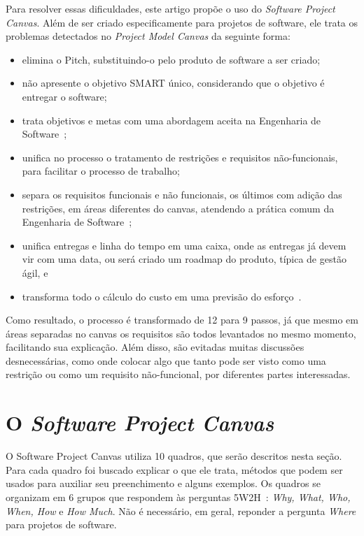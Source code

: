 \documentclass[a4]{report}
\begin{document}
Para resolver essas dificuldades, este artigo propõe o uso do \textit{Software Project Canvas}. Além de ser criado especificamente para projetos de software, ele trata os problemas detectados no \textit{Project Model Canvas} da seguinte forma:
\begin{itemize}
    \item elimina o Pitch, substituindo-o pelo produto de software a ser criado;
    \item não apresente o objetivo SMART único, considerando que o objetivo é entregar o software;
    \item trata objetivos e metas com uma abordagem aceita na Engenharia de Software~\citep{ruble_practical_1997};
    \item unifica no processo o tratamento de restrições e requisitos não-funcionais, para facilitar o processo de trabalho;
    \item separa os requisitos funcionais e não funcionais, os últimos com adição das restrições, em áreas diferentes do canvas, atendendo a prática comum da Engenharia de Software~\citep{pressman:2019};
    \item unifica entregas e linha do tempo em uma caixa, onde as entregas já devem vir com uma data, ou será criado um roadmap do produto, típica de gestão ágil, e
    \item transforma todo o cálculo do custo em uma previsão do esforço~\citep{mike:agile:estimating}.
\end{itemize}

Como resultado, o processo é transformado de 12 para 9 passos, já que mesmo em áreas separadas no canvas os requisitos são todos levantados no mesmo momento, facilitando sua explicação. Além disso, são evitadas muitas discussões desnecessárias, como onde colocar algo que tanto pode ser visto como uma restrição ou como um requisito não-funcional, por diferentes partes interessadas.

\section{O \textit{Software Project Canvas}}

O Software Project Canvas utiliza 10 quadros, que serão descritos nesta seção. Para cada quadro foi buscado explicar o que ele trata, métodos que podem ser usados para auxiliar seu preenchimento e alguns exemplos. Os quadros se organizam em 6 grupos que respondem às perguntas 5W2H~\citep{nakagawa:2012:5w2h}: \textit{Why, What, Who, When, How} e \textit{How Much}. Não é necessário, em geral, reponder a pergunta \textit{Where} para projetos de software.
\end{document}
